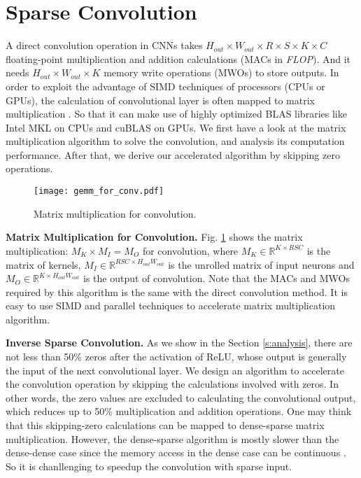 \documentclass{article}
\begin{document}
\section{Sparse Convolution}
A direct convolution operation in CNNs takes $H_{out}\times W_{out} \times R \times S \times K \times C$ floating-point multiplication and addition calculations (MACs in \textit{FLOP}). And it needs $H_{out}\times W_{out}\times K$ memory write operations (MWOs) to store outputs. In order to exploit the advantage of SIMD techniques of processors (CPUs or GPUs), the calculation of convolutional layer is often mapped to matrix multiplication \cite{chetlur2014cudnn,sze2017efficient}. So that it can make use of highly optimized BLAS libraries like Intel MKL on CPUs and cuBLAS on GPUs. We first have a look at the matrix multiplication algorithm to solve the convolution, and analysis its computation performance. After that, we derive our accelerated algorithm by skipping zero operations.

\begin{figure}[!ht]
  \centering
    \texttt{[image: gemm\_for\_conv.pdf]}
\caption{Matrix multiplication for convolution.}
\label{fig:gemmconv}
\end{figure}
\textbf{Matrix Multiplication for Convolution.} Fig. \ref{fig:gemmconv} shows the matrix multiplication: $M_K\times M_I=M_O$ for convolution, where $M_K \in \mathbb{R}^{K\times RSC}$ is the matrix of kernels, $M_I \in \mathbb{R}^{RSC\times H_{out}W_{out}}$ is the unrolled matrix of input neurons and $M_O \in \mathbb{R}^{K\times H_{out}W_{out}}$ is the output of convolution. Note that the MACs and MWOs required by this algorithm is the same with the direct convolution method. It is easy to use SIMD and parallel techniques to accelerate matrix multiplication algorithm. 

\textbf{Inverse Sparse Convolution.} As we show in the Section \ref{s:analysis}, there are not less than 50\% zeros after the activation of ReLU, whose output is generally the input of the next convolutional layer. We design an algorithm to accelerate the convolution operation by skipping the calculations involved with zeros. In other words, the zero values are excluded to calculating the convolutional output, which reduces up to 50\% multiplication and addition operations. One may think that this skipping-zero calculations can be mapped to dense-sparse matrix multiplication. However, the dense-sparse algorithm is mostly slower than the dense-dense case since the memory access in the dense case can be continuous \cite{liu2015sparse}. So it is chanllenging to speedup the convolution with sparse input. 
\end{document}
